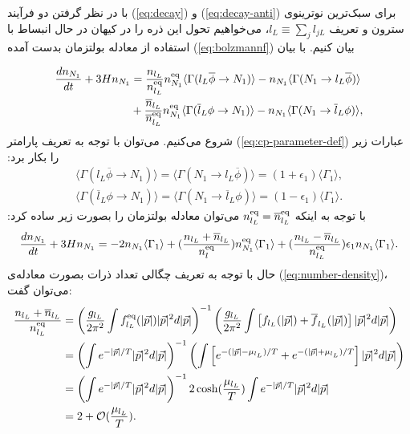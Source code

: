 \documentclass[a4paper]{book}
\begin{document}
با در نظر گرفتن دو فرآیند (\ref{eq:decay}) و (\ref{eq:decay-anti}) برای سبک‌ترین نوترینوی سترون و تعریف {\footnotesize$l_L\equiv\sum_j l_{jL}$}، می‌خواهیم تحول این ذره را در کیهان در حال انبساط با استفاده از معادله بولتزمان بدست آمده (\ref{eq:bolzmannf}) بیان کنیم. با بیان
\par
\vspace{-0.5cm}
{\footnotesize\begin{align}
	\frac{dn_{N_1}}{dt}+3Hn_{N_1} &= \frac{n_{l_L}}{n_{l_L}^{\rm eq}} n_{N_1}^{\rm eq} \langle\Gamma(l_L \overline{\phi} \to N_1)\rangle - n_{N_1}  \langle\Gamma(N_1 \to l_L \overline{\phi})\rangle \notag \\
	&+ \frac{\overline{n}_{l_L}}{\overline{n}_{l_L}^{\rm eq}} n_{N_1}^{\rm eq} \langle\Gamma(\overline{l}_L \phi \to N_1)\rangle - n_{N_1}  \langle\Gamma(N_1 \to \overline{l}_L \phi)\rangle,
\end{align}}
شروع می‌کنیم. می‌توان با توجه به تعریف پارامتر  (\ref{eq:cp-parameter-def}) عبارات زیر را بکار برد:
{\footnotesize\begin{align}
	\langle\Gamma(l_L \overline{\phi} \to N_1)\rangle=\langle\Gamma(N_1 \to l_L \overline{\phi})\rangle=(1+\epsilon_1)\langle\Gamma_1\rangle,
	\label{eq:boa}\\
	\langle\Gamma(\overline{l}_L \phi \to N_1)\rangle=\langle\Gamma(N_1 \to \overline{l}_L \phi)\rangle=(1-\epsilon_1)\langle\Gamma_1\rangle.
	\label{eq:bob}
\end{align}}
با توجه به اینکه {\footnotesize$n_{l_L}^{\rm eq} = \overline{n}_{l_L}^{\rm eq}$} می‌توان معادله بولتزمان را بصورت زیر ساده کرد:
{\footnotesize\begin{align}
		\frac{dn_{N_1}}{dt}+3Hn_{N_1} =-2 n_{N_1} \langle\Gamma_1\rangle + (\frac{n_{l_L} + \overline{n}_{l_L}}{n_l^{\rm eq}}) n_{N_1}^{\rm eq} \langle\Gamma_1\rangle + (\frac{n_{l_L} - \overline{n}_{l_L}}{n_{l_L}^{\rm eq}}) \epsilon_1 n_{N_1} \langle\Gamma_1\rangle.
		\label{eq:boltzmann-N1}
\end{align}}
حال با توجه به تعریف چگالی تعداد ذرات بصورت معادله‌ی (\ref{eq:number-density})، می‌توان گفت:
{\footnotesize\begin{align}
		\frac{n_{l_L}+\overline{n}_{l_L}}{n_{l_L}^{\rm eq}} &= \left(\frac{g_{l_L}}{2\pi^2}\int f_{l_L}^{\rm eq}(|\vec{p}|) |\vec{p}|^2 d|\vec{p}|\right)^{-1} \left(\frac{g_{l_L}}{2\pi^2}\int\left[f_{l_L}(|\vec{p}|)+\overline{f}_{l_L}(|\vec{p}|)\right]|\vec{p}|^2 d|\vec{p}|\right)\notag\\
		&=\left(\int e^{-|\vec{p}|/T}|\vec{p}|^2d|\vec{p}|\right)^{-1} \left(\int \left[e^{-(|\vec{p}|-\mu_{l_L})/T}+e^{-(|\vec{p}|+\mu_{l_L})/T}\right]|\vec{p}|^2d|\vec{p}|\right)\notag\\
		&=\left(\int e^{-|\vec{p}|/T}|\vec{p}|^2d|\vec{p}|\right)^{-1} 2\cosh(\frac{\mu_{l_L}}{T})\int e^{-|\vec{p}|/T}|\vec{p}|^2d|\vec{p}|\notag\\
		&=2+\mathcal{O}(\frac{\mu_{l_L}}{T}).
		\label{eq:bol}
\end{align}}
\end{document}
